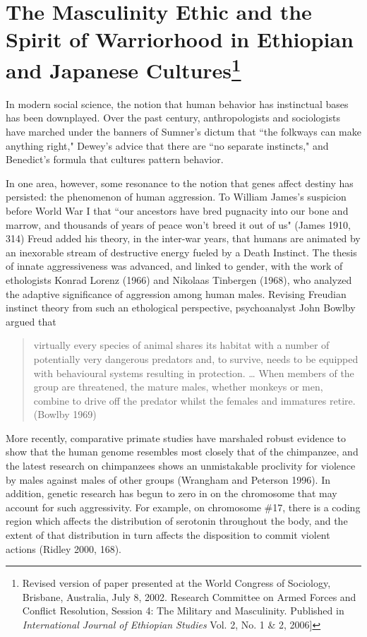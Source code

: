 \chapter[The Masculinity Ethic and the Spirit of Warriorhood (2006)]{The Masculinity Ethic and the Spirit of Warriorhood in Ethiopian and Japanese Cultures\footnote{Revised version of paper presented at the World Congress of Sociology, Brisbane, Australia, July 8, 2002. Research Committee on Armed Forces and Conflict Resolution, Session 4: The Military and Masculinity. Published in \emph{International Journal of Ethiopian Studies} Vol. 2, No. 1 \& 2, 2006]}}

In modern social science, the notion that human behavior has instinctual bases has been downplayed. Over the past century, anthropologists and sociologists have marched under the banners of Sumner's dictum that ``the folkways can make anything right," Dewey's advice that there are ``no separate instincts," and Benedict's formula that cultures pattern behavior. 

In one area, however, some resonance to the notion that genes affect destiny has persisted: the phenomenon of human aggression. To William James's suspicion before World War I that ``our ancestors have bred pugnacity into our bone and marrow, and thousands of years of peace won't breed it out of us" (James 1910, 314) Freud added his theory, in the inter-war years, that humans are animated by an inexorable stream of destructive energy fueled by a Death Instinct. The thesis of innate aggressiveness was advanced, and linked to gender, with the work of ethologists Konrad Lorenz (1966) and Nikolaas Tinbergen (1968), who analyzed the adaptive significance of aggression among human males. Revising Freudian instinct theory from such an ethological perspective, psychoanalyst John Bowlby argued that

\begin{quote}
virtually every species of animal shares its habitat with a number of potentially very dangerous predators and, to survive, needs to be equipped with behavioural systems resulting in protection. \ldots{} When members of the group are threatened, the mature males, whether monkeys or men, combine to drive off the predator whilst the females and immatures retire. (Bowlby 1969)
\end{quote}

More recently, comparative primate studies have marshaled robust evidence to show that the human genome resembles most closely that of the chimpanzee, and the latest research on chimpanzees shows an unmistakable proclivity for violence by males against males of other groups (Wrangham and Peterson 1996). In addition, genetic research has begun to zero in on the chromosome that may account for such aggressivity. For example, on chromosome \#17, there is a coding region which affects the distribution of serotonin throughout the body, and the extent of that distribution in turn affects the disposition to commit violent actions (Ridley 2000, 168).

